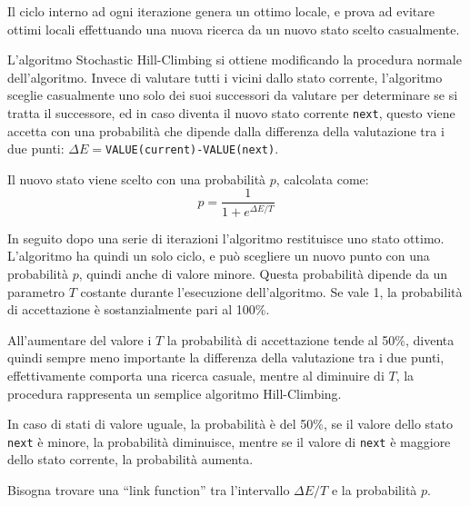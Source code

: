\documentclass{article}
\numberwithin{equation}{subsection}
\begin{document}

Il ciclo interno ad ogni iterazione genera un ottimo locale, e prova ad evitare ottimi locali effettuando una nuova ricerca da un nuovo stato scelto 
casualmente. 

L'algoritmo Stochastic Hill-Climbing si ottiene modificando la procedura normale dell'algoritmo. Invece di valutare tutti i vicini dallo stato corrente, l'algoritmo 
sceglie casualmente uno solo dei suoi successori da valutare per determinare se si tratta il successore, ed in caso diventa il nuovo stato corrente \verb|next|, questo 
viene accetta con una probabilità che dipende dalla differenza della valutazione tra i due punti: $\Delta E=$\verb|VALUE(current)-VALUE(next)|. 


Il nuovo stato viene scelto con una probabilità $p$, calcolata come:
\begin{equation}
  p=\displaystyle\frac{1}{1+e^{\Delta E/T}}
\end{equation}

In seguito dopo una serie di iterazioni l'algoritmo restituisce uno stato ottimo. L'algoritmo ha quindi un solo ciclo, e può scegliere un nuovo punto con una probabilità 
$p$, quindi anche di valore minore. Questa probabilità dipende da un parametro $T$ costante durante l'esecuzione dell'algoritmo. Se vale 1, la probabilità di 
accettazione è sostanzialmente pari al 100\%. 


All'aumentare del valore i $T$ la probabilità di accettazione tende al 50\%, diventa quindi sempre meno importante la differenza della valutazione tra i due punti, 
effettivamente comporta una ricerca casuale, mentre al diminuire di $T$, la procedura rappresenta un semplice algoritmo Hill-Climbing. 

In caso di stati di valore uguale, la probabilità è del 50\%, se il valore dello stato \verb|next| è minore, la probabilità diminuisce, mentre se il valore di \verb|next| 
è maggiore dello stato corrente, la probabilità aumenta. 


Bisogna trovare una ``link function'' tra l'intervallo $\Delta E/T$ e la probabilità $p$. 

\end{document}
